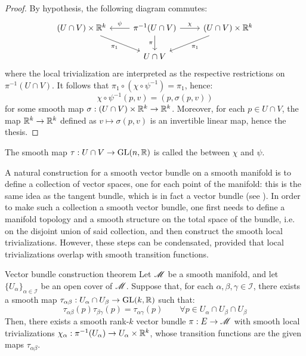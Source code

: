 \begin{proofbox}
  \begin{proof}
    By hypothesis, the following diagram commutes:
    \begin{equation*}
      \begin{tikzcd}
        (U \cap V) \times \R^k \ar[dr , "\pi_1" , swap] & \pi^{-1}(U \cap V) \ar[l , "\psi" , swap] \ar[r , "\chi"] \ar[d , "\pi" , swap] & (U \cap V) \times \R^k \ar[dl , "\pi_1"] \\
                                                                       & U \cap V
      \end{tikzcd}
    \end{equation*}
    where the local trivialization are interpreted as the respective restrictions on $ \pi^{-1}(U \cap V) $. It follows that $ \pi_1 \circ (\chi \circ \psi^{-1}) = \pi_1 $, hence:
    \begin{equation*}
      \chi \circ \psi^{-1}(p,v) = (p , \sigma(p,v))
    \end{equation*}
    for some smooth map $ \sigma : (U \cap V) \times \mathbb{R}^k \rightarrow \mathbb{R}^k $. Moreover, for each $ p \in U \cap V $, the map $ \mathbb{R}^k \rightarrow \mathbb{R}^k $ defined as $ v \mapsto \sigma(p,v) $ is an invertible linear map, hence the thesis.
  \end{proof}
\end{proofbox}

The smooth map $ \tau : U \cap V \rightarrow \mathrm{GL}(n,\mathbb{R}) $ is called the  between $ \chi $ and $ \psi $.

A natural construction for a smooth vector bundle on a smooth manifold is to define a collection of vector spaces, one for each point of the manifold: this is the same idea as the tangent bundle, which is in fact a vector bundle (see ). In order to make such a collection a smooth vector bundle, one first needs to define a manifold topology and a smooth structure on the total space of the bundle, i.e. on the disjoint union of said collection, and then construct the smooth local trivializations. However, these steps can be condensated, provided that local trivializations overlap with smooth transition functions.

\begin{theorem}{Vector bundle construction theorem}{}
  Let $ \mathscr{M} $ be a smooth manifold, and let $ \{U_\alpha\}_{\alpha \in \mathcal{I}} $ be an open cover of $ \mathscr{M} $. Suppose that, for each $ \alpha , \beta , \gamma \in \mathcal{I} $, there exists a smooth map $ \tau_{\alpha \beta} : U_\alpha \cap U_\beta \rightarrow \mathrm{GL}(k,\mathbb{R}) $ such that:
  \begin{equation}
    \tau_{\alpha \beta}(p) \tau_{\beta \gamma}(p) = \tau_{\alpha \gamma}(p)
    \qquad
    \forall p \in U_\alpha \cap U_\beta \cap U_\beta
  \end{equation}
  Then, there exists a smooth rank-$ k $ vector bundle $ \pi : E \rightarrow \mathscr{M} $ with smooth local trivializations $ \chi_\alpha : \pi^{-1}(U_\alpha) \rightarrow U_\alpha \times \mathbb{R}^k $, whose transition functions are the given maps $ \tau_{\alpha \beta} $.
\end{theorem}


